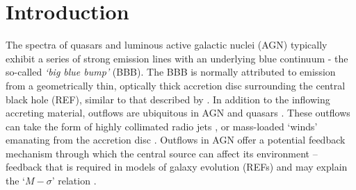 \documentclass[useAMS,usenatbib]{mn2e_x}
\begin{document}



%
%

\section{Introduction}


The spectra of 
quasars and luminous active galactic nuclei (AGN) 
typically exhibit a series of strong emission lines
with an underlying blue continuum - the so-called {\sl `big blue bump'} (BBB). 
The BBB is normally attributed to emission from a geometrically thin, 
optically thick accretion disc surrounding the central black hole (REF), similar
to that described by \cite{shakurasunyaev1973}.
In addition to the inflowing accreting material, 
outflows are ubiquitous in AGN
and quasars \citep{kellerman1989,ganguly2008}. These outflows can take the form of 
highly collimated radio jets \citep[e.g.][]{hazard1963,potash1980,perley1984,marscher2006}, 
or mass-loaded `winds' emanating from the accretion disc 
\citep{weymann1991,turnermiller2009}. 
Outflows in AGN offer a 
potential feedback mechanism through which the central source can 
affect its environment \citep{king2003,king2005,fabian2012}
-- feedback that is required in models of galaxy evolution (REFs) 
and may explain the `$M-\sigma$' relation \citep{silkrees1998,haring2004}.
\end{document}

